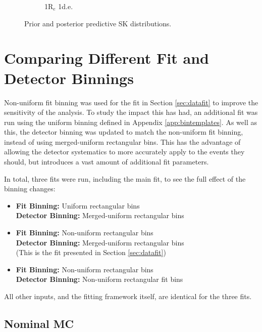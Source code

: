 \begin{figure}[!htbp]
\begin{subfigure}{.49\textwidth}
   \caption{1R$_{e}$ 1d.e.}
  \label{fig:skppnue1pi}
\end{subfigure}
\caption{Prior and posterior predictive SK distributions.}
\label{fig:skpp}
\end{figure}

\section{Comparing Different Fit and Detector Binnings}\label{sec:newbin}

Non-uniform fit binning was used for the fit in Section \ref{sec:datafit} to improve the sensitivity of the analysis. To study the impact this has had, an additional fit was run using the uniform binning defined in Appendix \ref{app:bintemplates}. As well as this, the detector binning was updated to match the non-uniform fit binning, instead of using merged-uniform rectangular bins. This has the advantage of allowing the detector systematics to more accurately apply to the events they should, but introduces a vast amount of additional fit parameters.

In total, three fits were run, including the main fit, to see the full effect of the binning changes:

\begin{itemize}

\item \textbf{Fit Binning: } Uniform rectangular bins\\
\textbf{Detector Binning: } Merged-uniform rectangular bins

\item \textbf{Fit Binning: } Non-uniform rectangular bins\\
\textbf{Detector Binning: } Merged-uniform rectangular bins\\
(This is the fit presented in Section \ref{sec:datafit})

\item \textbf{Fit Binning: } Non-uniform rectangular bins\\
\textbf{Detector Binning: } Non-uniform rectangular fit bins

\end{itemize}

All other inputs, and the fitting framework itself, are identical for the three fits.

\subsection{Nominal MC}

